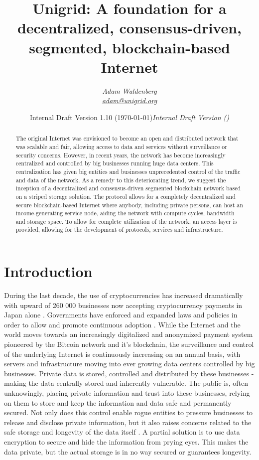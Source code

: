 \documentclass[10pt,a4paper,final]{article}
\author{\textit{Adam Waldenberg\\\href{mailto:adam@unigrid.org}{adam@unigrid.org}}}
\affil{The Unigrid Foundation\\\href{http://www.unigrid.org}{www.unigrid.org}}
\title{Unigrid: A foundation for a decentralized, consensus-driven, segmented, blockchain-based Internet}
\date{Internal Draft Version 1.10 (\today)}
\date{\emph{Internal Draft Version \gitRel\hspace{5pt}(\gitCommitterDate)}}
\begin{document}
\maketitle

\begin{abstract}
\noindent The original Internet was envisioned to become an open and distributed network that was scalable and fair, allowing access to data and services without surveillance or security concerns. However, in recent years, the network has become increasingly centralized and controlled by big businesses running huge data centers. This centralization has given big entities and businesses unprecedented control of the traffic and data of the network.
As a remedy to this deteriorating trend, we suggest the inception of a decentralized and consensus-driven segmented blockchain network based on a striped storage solution. The protocol allows for a completely decentralized and secure blockchain-based Internet where anybody, including private persons, can host an income-generating service node, aiding the network with compute cycles, bandwidth and storage space. To allow for complete utilization of the network, an access layer is provided, allowing for the development of protocols, services and infrastructure.
\end{abstract}

\section{Introduction}
During the last decade, the use of cryptocurrencies has increased dramatically with upward of 260 000 businesses now accepting cryptocurrency payments in Japan alone \cite{53companies2018}. Governments have enforced and expanded laws and policies in order to allow and promote continuous adoption \cite{japan2017}. While the Internet and the world moves towards an increasingly digitalized \cite{ekrona2019} and anonymized payment system pioneered by the Bitcoin network \cite{bitcoin2008} and it's blockchain, the surveillance and control of the underlying Internet is continuously increasing on an annual basis, with servers and infrastructure moving into ever growing data centers controlled by big businesses. Private data is stored, controlled and distributed by these businesses - making the data centrally stored and inherently vulnerable. The public is, often unknowingly, placing private information and trust into these businesses, relying on them to store and keep the information and data safe and permanently secured. Not only does this control enable rogue entities to pressure businesses to release and disclose private information, but it also raises concerns related to the safe storage and longevity of the data itself \cite{guardian2017,facebook2018}. A partial solution is to use data encryption to secure and hide the information from prying eyes. This makes the data private, but the actual storage is in no way secured or guarantees longevity.
\end{document}
